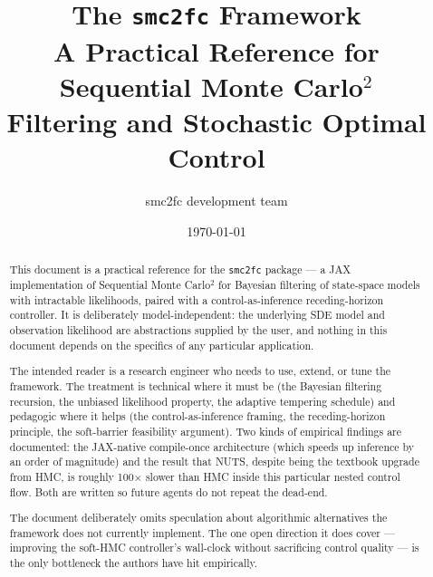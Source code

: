 \documentclass[11pt,a4paper]{article}
\title{The \texttt{smc2fc} Framework \\
\large A Practical Reference for Sequential Monte Carlo$^2$ \\
Filtering and Stochastic Optimal Control}
\author{smc2fc development team}
\date{\today}
\begin{document}
\maketitle

\begin{abstract}
\noindent
This document is a practical reference for the \texttt{smc2fc} package
--- a JAX implementation of Sequential Monte Carlo$^2$ for Bayesian
filtering of state-space models with intractable likelihoods, paired
with a control-as-inference receding-horizon controller. It is
deliberately model-independent: the underlying SDE model and observation
likelihood are abstractions supplied by the user, and nothing in this
document depends on the specifics of any particular application.

The intended reader is a research engineer who needs to use, extend, or
tune the framework. The treatment is technical where it must be (the
Bayesian filtering recursion, the unbiased likelihood property, the
adaptive tempering schedule) and pedagogic where it helps (the
control-as-inference framing, the receding-horizon principle, the
soft-barrier feasibility argument). Two kinds of empirical findings are
documented: the JAX-native compile-once architecture (which speeds up
inference by an order of magnitude) and the result that NUTS, despite
being the textbook upgrade from HMC, is roughly 100$\times$ slower than
HMC inside this particular nested control flow. Both are written so
future agents do not repeat the dead-end.

The document deliberately omits speculation about algorithmic
alternatives the framework does not currently implement. The one open
direction it does cover --- improving the soft-HMC controller's wall-clock
without sacrificing control quality --- is the only bottleneck the
authors have hit empirically.
\end{abstract}

\tableofcontents
\newpage













\appendix

\end{document}
